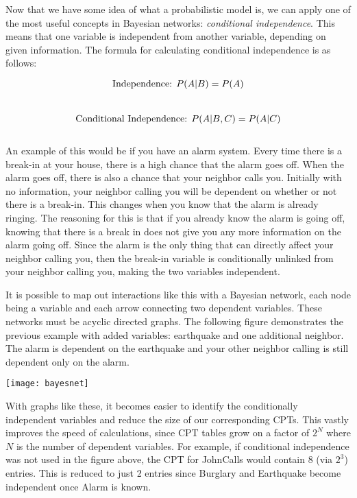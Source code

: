 Now that we have some idea of what a probabilistic model is, we can apply one of the most useful concepts in Bayesian networks: \textit{conditional independence}. This means that one variable is independent from another variable, depending on given information. The formula for calculating conditional independence is as follows:\par

\begin{equation}
  \textnormal{Independence: }
  P(A|B) = P(A)
\end{equation} \\[\eqnspace]
\begin{equation}
  \textnormal{Conditional Independence: }
  P(A|B,C) = P(A|C)
\end{equation} \\[\eqnspace]

An example of this would be if you have an alarm system. Every time there is a break-in at your house, there is a high chance that the alarm goes off. When the alarm goes off, there is also a chance that your neighbor calls you. Initially with no information, your neighbor calling you will be dependent on whether or not there is a break-in. This changes when you know that the alarm is already ringing. The reasoning for this is that if you already know the alarm is going off, knowing that there is a break in does not give you any more information on the alarm going off. Since the alarm is the only thing that can directly affect your neighbor calling you, then the break-in variable is conditionally unlinked from your neighbor calling you, making the two variables independent.\par
It is possible to map out interactions like this with a Bayesian network, each node being a variable and each arrow connecting two dependent variables. These networks must be acyclic directed graphs. The following figure demonstrates the previous example with added variables: earthquake and one additional neighbor. The alarm is dependent on the earthquake and your other neighbor calling is still dependent only on the alarm.\par

\begin{center}
  \texttt{[image: bayesnet]}
\end{center}

With graphs like these, it becomes easier to identify the conditionally independent variables and reduce the size of our corresponding CPT\textquotesingle s. This vastly improves the speed of calculations, since CPT tables grow on a factor of $2^N$ where $N$ is the number of dependent variables. For example, if conditional independence was not used in the figure above, the CPT for JohnCalls would contain 8 (via $2^3$) entries. This is reduced to just 2 entries since Burglary and Earthquake become independent once Alarm is known.
